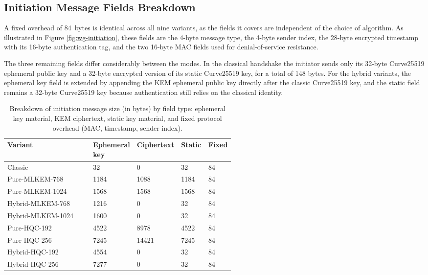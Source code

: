 \subsection{Initiation Message Fields Breakdown}

A fixed overhead of \qty{84}{bytes} is identical across all nine variants, as the fields it covers are independent of the choice of algorithm. As illustrated in Figure \ref{fig:wg-initiation}, these fields are the 4-byte message type, the 4-byte sender index, the 28-byte encrypted timestamp with its 16-byte authentication tag, and the two 16-byte MAC fields used for denial-of-service resistance.

The three remaining fields differ considerably between the modes. In the classical handshake the initiator sends only its 32-byte Curve25519 ephemeral public key and a 32-byte encrypted version of its static Curve25519 key, for a total of 148 bytes. For the hybrid variants, the ephemeral key field is extended by appending the KEM ephemeral public key directly after the classic Curve25519 key, and the static field remains a 32-byte Curve25519 key because authentication still relies on the classical identity. 

\begin{table}[H]
\centering
\begin{tabular}{|l|R{0.18\linewidth}R{0.14\linewidth}R{0.12\linewidth}R{0.1\linewidth}|}
\hline
\textbf{Variant} & Ephemeral key & Ciphertext & Static & Fixed \\
\hline
Classic           & 32    & 0     & 32    & 84 \\
Pure-MLKEM-768    & 1184  & 1088  & 1184  & 84 \\
Pure-MLKEM-1024   & 1568  & 1568  & 1568  & 84 \\
Hybrid-MLKEM-768  & 1216  & 0     & 32    & 84 \\
Hybrid-MLKEM-1024 & 1600  & 0     & 32    & 84 \\
Pure-HQC-192      & 4522  & 8978  & 4522  & 84 \\
Pure-HQC-256      & 7245  & \num{14421} & 7245  & 84 \\
Hybrid-HQC-192    & 4554  & 0     & 32    & 84 \\
Hybrid-HQC-256    & 7277  & 0     & 32    & 84 \\
\hline
\end{tabular}
\caption{Breakdown of initiation message size (in bytes) by field type: ephemeral key material, KEM ciphertext, static key material, and fixed protocol overhead (MAC, timestamp, sender index).}
\label{tab:InitiationMessageBreakdown}
\end{table}

